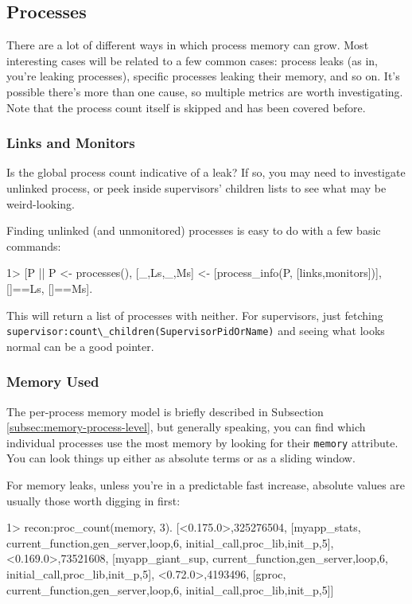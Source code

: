 \documentclass[11pt, oneside]{book}   	%
\newcommand{\expression}[1]{\Verb`#1`}
\newcommand{\term}[1]{\Verb`#1`}
\begin{document}
\subsection{Processes}

There are a lot of different ways in which process memory can grow. Most interesting cases will be related to a few common cases: process leaks (as in, you're leaking processes), specific processes leaking their memory, and so on. It's possible there's more than one cause, so multiple metrics are worth investigating. Note that the process count itself is skipped and has been covered before.

\subsubsection{Links and Monitors}

Is the global process count indicative of a leak? If so, you may need to investigate unlinked process, or peek inside supervisors' children lists to see what may be weird-looking.

Finding unlinked (and unmonitored) processes is easy to do with a few basic commands:

\begin{VerbatimEshell}
1> [P || P <- processes(),
         [{_,Ls},{_,Ms}] <- [process_info(P, [links,monitors])],
         []==Ls, []==Ms].
\end{VerbatimEshell}

This will return a list of processes with neither. For supervisors, just fetching \expression{supervisor:count\_children(SupervisorPidOrName)} and seeing what looks normal can be a good pointer.


\subsubsection{Memory Used}

The per-process memory model is briefly described in Subsection \ref{subsec:memory-process-level}, but generally speaking, you can find which individual processes use the most memory by looking for their \term{memory} attribute. You can look things up either as absolute terms or as a sliding window.

For memory leaks, unless you're in a predictable fast increase, absolute values are usually those worth digging in first:

\begin{VerbatimEshell}
1> recon:proc_count(memory, 3).
[{<0.175.0>,325276504,
  [myapp_stats,
   {current_function,{gen_server,loop,6}},
   {initial_call,{proc_lib,init_p,5}}]},
 {<0.169.0>,73521608,
  [myapp_giant_sup,
   {current_function,{gen_server,loop,6}},
   {initial_call,{proc_lib,init_p,5}}]},
 {<0.72.0>,4193496,
  [gproc,
   {current_function,{gen_server,loop,6}},
   {initial_call,{proc_lib,init_p,5}}]}]
\end{VerbatimEshell}
\end{document}
